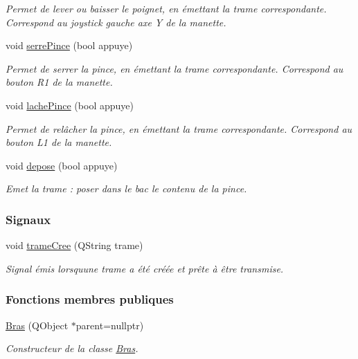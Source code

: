 \begin{DoxyCompactItemize}
\begin{DoxyCompactList}\small\item\em Permet de lever ou baisser le poignet, en émettant la trame correspondante. Correspond au joystick gauche axe Y de la manette. \end{DoxyCompactList}\item 
void \hyperlink{class_bras_a55e143cf8e696ed214809ae25fb558d5}{serre\+Pince} (bool appuye)
\begin{DoxyCompactList}\small\item\em Permet de serrer la pince, en émettant la trame correspondante. Correspond au bouton R1 de la manette. \end{DoxyCompactList}\item 
void \hyperlink{class_bras_a246e835f25bd61f0618c58aafea99ea1}{lache\+Pince} (bool appuye)
\begin{DoxyCompactList}\small\item\em Permet de relâcher la pince, en émettant la trame correspondante. Correspond au bouton L1 de la manette. \end{DoxyCompactList}\item 
void \hyperlink{class_bras_a69d95616a74732e13b23bd90680d7d21}{depose} (bool appuye)
\begin{DoxyCompactList}\small\item\em Emet la trame \+: poser dans le bac le contenu de la pince. \end{DoxyCompactList}\end{DoxyCompactItemize}
\subsubsection*{Signaux}
\begin{DoxyCompactItemize}
\item 
void \hyperlink{class_bras_ab442bf8d3e389c051b26b4b0741e7924}{trame\+Cree} (Q\+String trame)
\begin{DoxyCompactList}\small\item\em Signal émis lorsqu\textquotesingle{}une trame a été créée et prête à être transmise. \end{DoxyCompactList}\end{DoxyCompactItemize}
\subsubsection*{Fonctions membres publiques}
\begin{DoxyCompactItemize}
\item 
\hyperlink{class_bras_aa194e94737e1e024e7f9a0cd6ecb6594}{Bras} (Q\+Object $\ast$parent=nullptr)
\begin{DoxyCompactList}\small\item\em Constructeur de la classe \hyperlink{class_bras}{Bras}. \end{DoxyCompactList}\end{DoxyCompactItemize}
